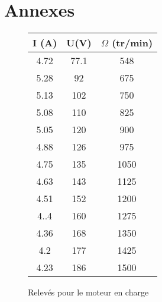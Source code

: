 \documentclass[oneside,a4paper,12pt]{article}
\begin{document}
	\section{Annexes}
	\begin{figure}[h]
		\begin{center}
			\begin{tabular}{|c|c|c|}
				\hline
				I (A) & U(V) & $\Omega$ (tr/min)\\
				\hline
				4.72 & 77.1 & 548\\
				\hline
				5.28 & 92 & 675\\
				\hline
				5.13 & 102 & 750\\
				\hline
				5.08 & 110 & 825\\
				\hline
				5.05 & 120 & 900\\
				\hline
				4.88 & 126 & 975\\
				\hline
				4.75 & 135 & 1050\\
				\hline
				4.63 & 143 & 1125\\
				\hline
				4.51 & 152 & 1200\\
				\hline
				4..4 & 160 & 1275\\
				\hline
				4.36 & 168 & 1350\\
				\hline
				4.2 & 177 & 1425\\
				\hline
				4.23 & 186 & 1500\\
				\hline
			\end{tabular}
		\end{center}
	\caption{Relevés pour le moteur en charge}
	\end{figure}
	
	
	
\end{document}
